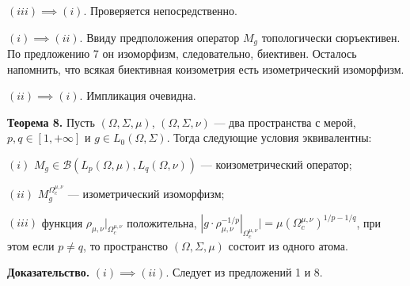 \documentclass[11pt,twoside]{article}
\begin{document}
    $(iii)$$\implies$$ (i)$. Проверяется непосредственно.

    $(i)$$\implies$$ (ii)$. Ввиду предположения оператор $M_g$ топологически
        сюръективен. По предложению 7 он изоморфизм, следовательно, биективен.
        Осталось напомнить, что всякая биективная коизометрия есть
        изометрический изоморфизм.

    $(ii)$$\implies$$ (i)$. Импликация очевидна.

        \textbf{Теорема 8.} Пусть $(\Omega,\Sigma,\mu)$, $(\Omega,\Sigma,\nu)$
        --- два пространства с мерой, $p,q\in[1,+\infty]$ и $g\in
    L_0(\Omega,\Sigma)$. Тогда следующие условия эквивалентны:

    $(i)$ $M_g\in\mathcal{B}(L_p(\Omega,\mu), L_q(\Omega,\nu))$ ---
        коизометрический оператор;

    $(ii)$ $M_g^{\Omega_c^{\mu,\nu}}$ --- изометрический изоморфизм;

    $(iii)$ функция $\rho_{\mu,\nu}|_{\Omega_c^{\mu,\nu}}$ положительна,
    $|g\cdot\rho_{\mu,\nu}^{-1/p}|_{\Omega_c^{\mu,\nu}}|
    ={\mu(\Omega_c^{\mu,\nu})}^{1/p-1/q}$, при этом если $p\neq q$, то
        пространство $(\Omega,\Sigma,\mu)$ состоит из одного атома.

        \textbf{Доказательство.} $(i)$$\implies$$ (ii)$. Следует из предложений
        1 и 8.
\end{document}
